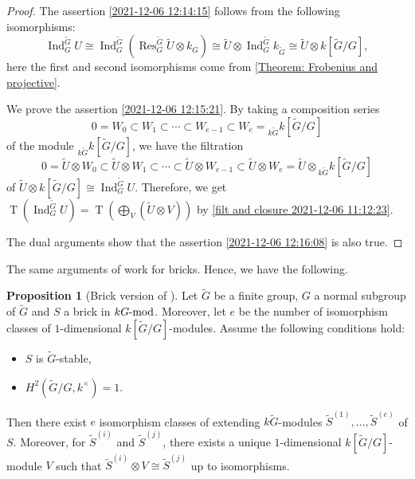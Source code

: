 \documentclass[pdftex,a4paper]{article}
\numberwithin{equation}{subsection}
\theoremstyle{definition}
\newtheorem{proposition}[theorem]{Proposition}
\newcommand{\lmod}{\operatorname{\mathrm{\hspace{-2pt}-mod}}}
\newcommand{\induc}{{\operatorname{Ind}\nolimits}}
\newcommand{\restr}{{\operatorname{Res}\nolimits}}
\newcommand{\torscl}{\operatorname{\mathrm{T}}}
\begin{document}
\begin{proof}
	The assertion \ref{2021-12-06 12:14:15} follows from the following isomorphisms:
	\begin{equation}
		\induc_G^{\tilde{G}} U\cong \induc_G^{\tilde{G}}( \restr_G^{\tilde{G}}\tilde{U}\otimes k_G)\cong  \tilde{U}\otimes \induc_G^{\tilde{G}}k_{\tilde{G}}
		\cong\tilde{U}\otimes k[\tilde{G}/G],
	\end{equation}
	here the first and second isomorphisms come from \cref{Theorem: Frobenius and projective}.

	We prove the assertion \ref{2021-12-06 12:15:21}.
	By taking a composition series
	\begin{equation}
		0=W_0\subset W_1\subset \cdots \subset W_{e-1}\subset W_e={}_{k\tilde{G}}k[\tilde{G}/G]
	\end{equation}
	of the module \({}_{k\tilde{G}}k[\tilde{G}/G]\), we have the filtration
	\begin{equation}
		0=\tilde{U}\otimes W_0  \subset \tilde{U}\otimes W_1 \subset \cdots \subset \tilde{U}\otimes W_{e-1} \subset \tilde{U}\otimes W_e =\tilde{U}\otimes {}_{k\tilde{G}}k[\tilde{G}/G]
	\end{equation}
	of \(\tilde{U}\otimes k[\tilde{G}/G]\cong \induc_G^{\tilde{G}}U\).
	Therefore, we get \(\torscl(\induc_G^{\tilde{G}} U)= \torscl(\bigoplus_V (\tilde{U}\otimes V))\) by \cref{filt and closure 2021-12-06 11:12:23}.

	The dual arguments show that the assertion \ref{2021-12-06 12:16:08} is also true.
\end{proof}
The same arguments of \cite[Theorems 3.5.7, Theorem 3.5.8 and Corollary 3.5.9]{MR998775} work for bricks.
Hence, we have the following.
\begin{proposition}[{Brick version of \cite[Corollary 3.5.9]{MR998775}}]\label{extending action}
	Let \(\tilde{G}\) be a finite group, \(G\) a normal subgroup of \(\tilde{G}\) and \(S\) a brick in \(kG\lmod\).
	Moreover, let \(e\) be the number of isomorphism classes of \(1\)-dimensional \(k[\tilde{G}/G]\)-modules.
	Assume the following conditions hold:
	\begin{itemize}
		\item \(S\) is \(\tilde{G}\)-stable,
		\item \(H^2(\tilde{G}/G,k^\times)=1\).
	\end{itemize}
	Then there exist \(e\) isomorphism classes of extending \(k\tilde{G}\)-modules \(\tilde{S}^{(1)},\ldots, \tilde{S}^{(e)}\) of \(S\).
	Moreover, for \(\tilde{S}^{(i)}\) and \(\tilde{S}^{(j)}\), there exists a unique \(1\)-dimensional \(k[\tilde{G}/G]\)-module \(V\) such that \(\tilde{S}^{(i)}\otimes V\cong \tilde{S}^{(j)}\) up to isomorphisms.
\end{proposition}
\end{document}
